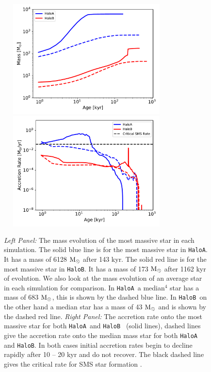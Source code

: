 \documentclass[graphics, twocolumn, usenatbib]{mn2e}
\newcommand{\msolar} {$\rm{M_{\odot}}~$}
\newcommand{\msolarc} {$\rm{M_{\odot}}$}
\newcommand{\ha} {\texttt{HaloA~}}
\newcommand{\hb} {\texttt{HaloB~}}
\newcommand{\hbc} {\texttt{HaloB}}
\begin{document}

\begin{figure}
\centering
\begin{minipage}{175mm}      \begin{center}
    \centerline{
      \includegraphics[width=9.0cm, height=6cm]{FIGURES/Mass_MultipleHaloes.pdf}
      \includegraphics[width=9.0cm, height=6cm]{FIGURES/MassAccretionRate_MultipleHaloes.pdf}}
    \caption{
      \textit{Left Panel:} The mass evolution of the most massive star in each simulation. The
      solid blue line is for the most massive star in \texttt{HaloA}. It has a mass of
      6128 \msolar after 143 kyr. The solid red line is for the most massive star in \texttt{HaloB}.
      It has a mass of 173 \msolar after 1162 kyr of evolution. We also look at the mass evolution
      of an average star in each simulation for comparison. In \ha a median$^4$ star has a mass of 683
      \msolarc, this is shown by the dashed blue line. In \hb on the other hand a median star has a
      mass of 43 \msolar and is shown by the dashed red line. 
      \textit{Right Panel:} The accretion rate onto the most massive star for both \ha and \hb
      (solid lines), dashed lines give the accretion rate onto the median mass star for both \ha
      and \hbc. In both cases initial accretion rates begin to decline rapidly after 10 -- 20 kyr and
      do not recover. The black dashed line gives the critical rate for SMS star formation
      \citep{Sakurai_2016}.
    }
\label{Fig:AccretionRates}
\end{center} \end{minipage}
\end{figure}
\end{document}
